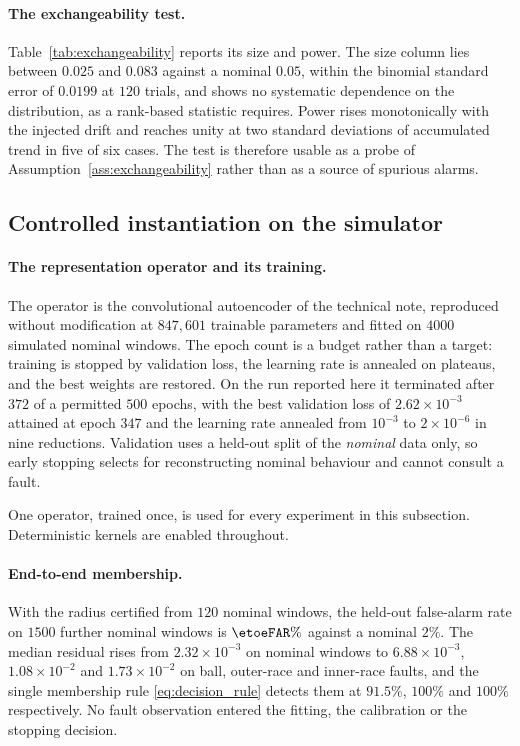 \documentclass[a4paper]{cas-sc}
\begin{document}
\paragraph{The exchangeability test.}
Table~\ref{tab:exchangeability} reports its size and power. The size column
lies between \(0.025\) and \(0.083\) against a nominal \(0.05\), within the
binomial standard error of \(0.0199\) at \(120\) trials, and shows no
systematic dependence on the distribution, as a rank-based statistic requires.
Power rises monotonically with the injected drift and reaches unity at two
standard deviations of accumulated trend in five of six cases. The test is
therefore usable as a probe of Assumption~\ref{ass:exchangeability} rather
than as a source of spurious alarms.



\subsection{Controlled instantiation on the simulator}
\label{subsec:results_simulator}

\paragraph{The representation operator and its training.}
The operator is the convolutional autoencoder of the technical note,
reproduced without modification at \(847{,}601\) trainable parameters and
fitted on \(4000\) simulated nominal windows. The epoch count is a budget
rather than a target: training is stopped by validation loss, the learning
rate is annealed on plateaus, and the best weights are restored. On the run
reported here it terminated after \(372\) of a permitted \(500\) epochs, with
the best validation loss of \(2.62\times10^{-3}\) attained at epoch \(347\)
and the learning rate annealed from \(10^{-3}\) to \(2\times10^{-6}\) in nine
reductions. Validation uses a held-out split of the \emph{nominal} data only,
so early stopping selects for reconstructing nominal behaviour and cannot
consult a fault.

One operator, trained once, is used for every experiment in this subsection.
Deterministic kernels are enabled throughout.

\paragraph{End-to-end membership.}
With the radius certified from \(120\) nominal windows, the held-out
false-alarm rate on \(1500\) further nominal windows is \(\etoeFAR\%\)
against a nominal \(2\%\). The median residual rises from \(2.32\times10^{-3}\) on
nominal windows to \(6.88\times10^{-3}\), \(1.08\times10^{-2}\) and
\(1.73\times10^{-2}\) on ball, outer-race and inner-race faults, and the
single membership rule \eqref{eq:decision_rule} detects them at \(91.5\%\),
\(100\%\) and \(100\%\) respectively. No fault observation entered the
fitting, the calibration or the stopping decision.
\end{document}
